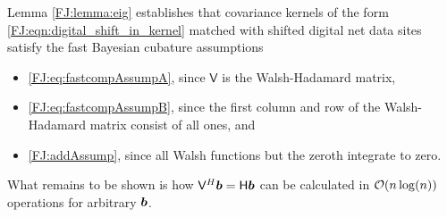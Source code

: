 \documentclass[graybox,footinfo]{svmult}
\begin{document}
Lemma \ref{FJ:lemma:eig} establishes that covariance kernels of the form \eqref{FJ:eqn:digital_shift_in_kernel} matched with shifted digital net data sites satisfy the fast Bayesian cubature assumptions
\begin{itemize}
    \item \eqref{FJ:eq:fastcompAssumpA}, since $\mathsf{V}$ is the Walsh-Hadamard matrix,
    
    \item  \eqref{FJ:eq:fastcompAssumpB}, since the first column and row of the  Walsh-Hadamard matrix consist of all ones, and
    
    \item \eqref{FJ:addAssump}, since all Walsh functions but the zeroth integrate to zero.
\end{itemize}
What remains to be shown is how $\mathsf{V}^H {\boldsymbol{b}} = \mathsf{H} {\boldsymbol{b}}$ can be calculated in ${\mathcal{O}}(n \log(n))$ operations for arbitrary ${\boldsymbol{b}}$.
\end{document}
